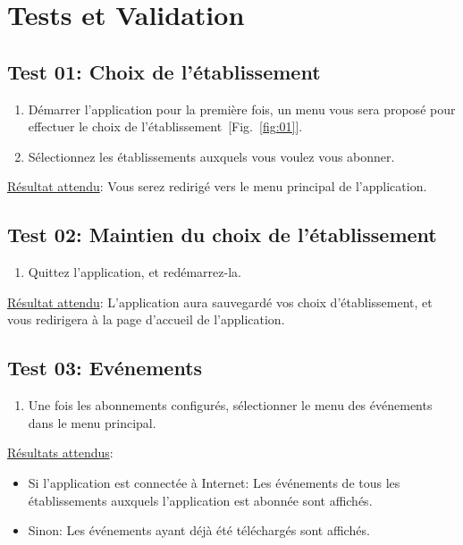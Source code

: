 \documentclass [pdftex,12pt] {report}
\begin{document}
\chapter{Tests et Validation}
  
  \section{Test 01: Choix de l'établissement}
    \begin{enumerate}
    \item Démarrer l'application pour la première fois, un menu vous sera proposé pour effectuer le choix de l'établissement~[Fig.~\ref{fig:01}].
    \item Sélectionnez les établissements auxquels vous voulez vous abonner.
    \end{enumerate}

    \underline{Résultat attendu}: Vous serez redirigé vers le menu principal de l'application.

  \section{Test 02: Maintien du choix de l'établissement}
    \begin{enumerate}
    \item Quittez l'application, et redémarrez-la.
    \end{enumerate}

    \underline{Résultat attendu}: L'application aura sauvegardé vos choix d'établissement, et vous redirigera à la page d'accueil de l'application.

  \section{Test 03: Evénements}
    \begin{enumerate}
    \item Une fois les abonnements configurés, sélectionner le menu des événements dans le menu principal.
    \end{enumerate}

    \underline{Résultats attendus}:
    \begin{itemize}
    \item Si l'application est connectée à Internet: Les événements de tous les établissements auxquels l'application est abonnée sont affichés.
    \item Sinon: Les événements ayant déjà été téléchargés sont affichés.
    \end{itemize}
\end{document}
